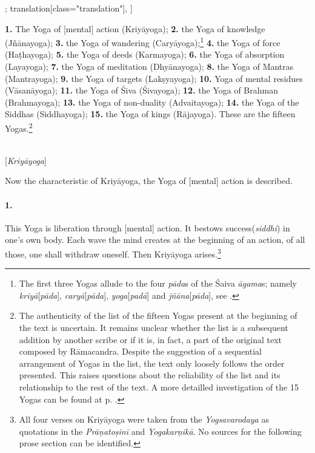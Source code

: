 \begin{alignment}[
    texts=edition[class="edition"];
    translation[class="translation"],
  ]
\begin{translation}
\begin{tlate}
\indent \textbf{1.} The Yoga of [mental] action (Kriyāyoga); \textbf{2.} the Yoga of knowledge (Jñānayoga); \textbf{3.} the Yoga of wandering (Caryāyoga);\footnote{The first three Yogas allude to the four \textit{pāda}s of the Śaiva \textit{āgama}s; namely \textit{kriyā}[\textit{pāda}], \textit{caryā}[\textit{pāda}], \textit{yoga}[\textit{padā}] and \textit{jñāna}[\textit{pāda}], see \citeauthor[2015: 77]{nishvasa2015}.} \textbf{4.} the Yoga of force (Haṭhayoga); \textbf{5.} the Yoga of deeds (Karmayoga); \textbf{6.} the Yoga of absorption (Layayoga); \textbf{7.} the Yoga of meditation (Dhyānayoga); \textbf{8.} the Yoga of Mantras (Mantrayoga); \textbf{9.} the Yoga of targets (Lakṣyayoga); \textbf{10.} Yoga of mental residues (Vāsanāyoga); \textbf{11.} the Yoga of Śiva (Śivayoga); \textbf{12.} the Yoga of Brahman (Brahmayoga); \textbf{13.} the Yoga of non-duality (Advaitayoga); \textbf{14.} the Yoga of the Siddhas (Siddhayoga); \textbf{15.} the Yoga of kings (Rājayoga). These are the fifteen Yogas.\footnote{The authenticity of the list of the fifteen Yogas present at the beginning of the text is uncertain. It remains unclear whether the list is a subsequent addition by another scribe or if it is, in fact, a part of the original text composed by Rāmacandra. Despite the suggestion of a sequential arrangement of Yogas in the list, the text only loosely follows the order presented. This raises questions about the reliability of the list and its relationship to the rest of the text. A more detailled investigation of the 15 Yogas can be found at p. \pageref{yogas_list}.}\\\\
      \bigskip 
      \centerline{\textrm{\small{[\textit{Kriyāyoga}]}}}
      \bigskip
      \indent Now the characteristic of Kriyāyoga, the Yoga of [mental] action is described. \paragraph{1.} This Yoga is liberation through [mental] action. It bestows success(\textit{siddhi}) in one's own body. Each wave the mind creates at the beginning of an action, of all those, one shall withdraw oneself. Then Kriyāyoga arises.\footnote{All four verses on Kriyāyoga were taken from the \textit{Yogsavarodaya} as quotations in the \textit{Prāṇatoṣinī} and \textit{Yogakarṇikā}. No sources for the following prose section can be identified.}\vspace*{\fill}
      \vfill
\end{tlate}
 \ekdpb*{}
   \end{translation}
 \end{alignment}
